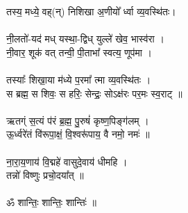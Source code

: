 तस्य॒ मध्ये॒ वह्(न्) निशिखा अ॒णीयो᳚ र्ध्वा व्य॒वस्थि॑तः।\\
\\
नी॒लतो॑-यद॑ मध् यस्था॒-द्विध् युल्ले॑ खेव॒ भास्व॑रा ।\\
नी॒वार॒ शूक॑ वत् तन्वी॒ पी॒ताभा᳚ स्वत्य॒ णूप॑मा ।\\
\\
तस्याः᳚ शिखा॒या म॑ध्ये प॒रमा᳚ त्मा व्य॒वस्थि॑तः ।\\
स ब्रह्म॒ स शिवः॒ स हरिः॒ सेन्द्रः॒ सोऽक्ष॑रः पर॒मः स्व॒राट् ॥\\
\\
ऋतग्ं स॒त्यं प॑रं ब्र॒ह्म॒ पु॒रुषं॑ कृष्ण॒पिङ्ग॑लम् ।\\
ऊ॒र्ध्वरे॑तं वि॑रूपा॒क्षं॒ वि॒श्वरू॑पाय॒ वै नमो॒ नमः॑ ॥\\
\\
ना॒रा॒य॒णाय॑ वि॒द्महे॑ वासुदे॒वाय॑ धीमहि ।\\
तन्नो॑ विष्णुः प्रचो॒दया᳚त् ॥ \\
\\
ॐ शान्तिः॒ शान्तिः॒ शान्तिः॑ ॥\\
